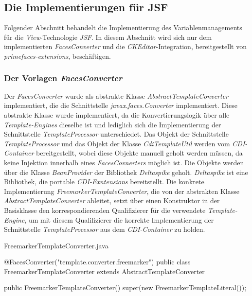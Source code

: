 \subsection{Die Implementierungen für JSF}
Folgender Abschnitt behandelt die Implementierung des Variablenmanagements für die \emph{View}-Technologie \emph{JSF}. In diesem Abschnitt wird sich nur dem implementierten \emph{FacesConverter} und die \emph{CKEditor}-Integration, bereitgestellt von \emph{primefaces-extensions}, beschäftigen.

\subsubsection{Der Vorlagen \emph{FacesConverter}}
Der \emph{FacesConverter} wurde als abstrakte Klasse \emph{AbstractTemplateConverter} implementiert, die die Schnittstelle \emph{javax.faces.Converter} implementiert. Diese abstrakte Klasse wurde implementiert, da die Konvertierungslogik über alle \emph{Template-Engines} dieselbe ist und lediglich sich die Implementierung der Schnittstelle \emph{TemplateProcessor} unterschiedet. Das Objekt der Schnittstelle \emph{TemplateProcessor} und das Objekt der Klasse \emph{CdiTemplateUtil} werden vom \emph{CDI-Container} bereitgestellt, wobei diese Objekte manuell geholt werden müssen, da keine Injektion innerhalb eines \emph{FacesCovnerters} möglich ist. Die Objekte werden über die Klasse \emph{BeanProvider} der Bibliothek \emph{Deltaspike} geholt. \emph{Deltaspike} ist eine Bibliothek, die portable \emph{CDI-Exntensions} bereitstellt. Die konkrete Implementierung \emph{FreemarkerTemplateConverter}, die von der abstrakten Klasse \emph{AbstractTemplateConverter} ableitet, setzt über einen Konstruktor in der Basisklasse den korrespondierenden Qualifizierer für die verwendete \emph{Template-Engine}, um mit diesem Qualifizierer die korrekte Implementierung der Schnittstelle \emph{TemplateProcessor} aus dem \emph{CDI-Container} zu holden.
\newpage
\begin{program}
\caption{FreemarkerTemplateConverter.java}
\label{prog:freemarkerTemplateConverter}
\begin{JavaCode}
@FacesConverter("template.converter.freemarker")
public class FreemarkerTemplateConverter extends AbstractTemplateConverter {

    public FreemarkerTemplateConverter() {
        super(new FreemarkerTemplateLiteral());
    }
}
\end{JavaCode}
\end{program}
\ \newline
